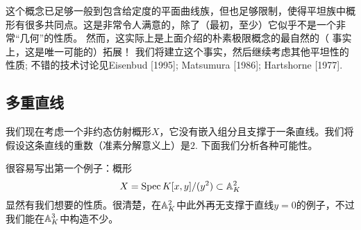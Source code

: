 这个概念已足够一般到包含给定度的平面曲线族，但也足够限制，使得平坦族中概形有很多共同点。这是非常令人满意的，除了（最初，至少）它似乎不是一个非常“几何”的性质。 然而，这实际上是上面介绍的朴素极限概念的最自然的（ 事实上，这是唯一可能的）拓展！ 我们将建立这个事实，然后继续考虑其他平坦性的性质; 不错的技术讨论见Eisenbud [1995]; Matsumura [1986]; Hartshorne [1977]. \nottran

\subsection{多重直线}

我们现在考虑一个非约态仿射概形$X$，它没有嵌入组分且支撑于一条直线。我们将假设这条直线的重数（准素分解意义上）是$2$. 下面我们分析各种可能性。

很容易写出第一个例子：概形
\[
	X=\operatorname{Spec} K[x,y]/(y^2)\subset \mathbb{A}_K^2
\]
显然有我们想要的性质。很清楚，在$\mathbb{A}_K^2$中此外再无支撑于直线$y=0$的例子，不过我们能在$\mathbb{A}_K^3$中构造不少。
